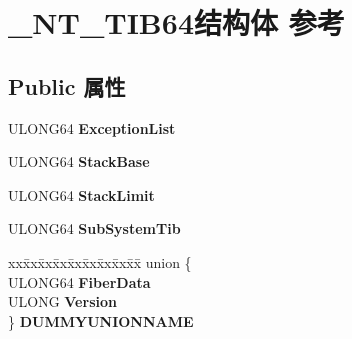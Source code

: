 \hypertarget{struct___n_t___t_i_b64}{}\section{\+\_\+\+N\+T\+\_\+\+T\+I\+B64结构体 参考}
\label{struct___n_t___t_i_b64}
\subsection*{Public 属性}
\begin{DoxyCompactItemize}
\item 
\mbox{\label{struct___n_t___t_i_b64_a354a0b67189efc2a2ab5ce220087d8d7}} 
U\+L\+O\+N\+G64 {\bfseries Exception\+List}
\item 
\mbox{\label{struct___n_t___t_i_b64_acb7ab5a27a21d904c96a5353bedf9b82}} 
U\+L\+O\+N\+G64 {\bfseries Stack\+Base}
\item 
\mbox{\label{struct___n_t___t_i_b64_a2b77c98f74a15c56909d1505c7f5b420}} 
U\+L\+O\+N\+G64 {\bfseries Stack\+Limit}
\item 
\mbox{\label{struct___n_t___t_i_b64_a70c9cf9220a949ac87b3ea56a741bac9}} 
U\+L\+O\+N\+G64 {\bfseries Sub\+System\+Tib}
\item 
\mbox{\label{struct___n_t___t_i_b64_ac2fd5ad77b5b01bca50f136364ddad2e}} 
\begin{tabbing}
xx\=xx\=xx\=xx\=xx\=xx\=xx\=xx\=xx\=\kill
union \{\\
\>ULONG64 {\bfseries FiberData}\\
\>ULONG {\bfseries Version}\\
\} {\bfseries DUMMYUNIONNAME}\\


\end{tabbing}
\end{DoxyCompactItemize}
